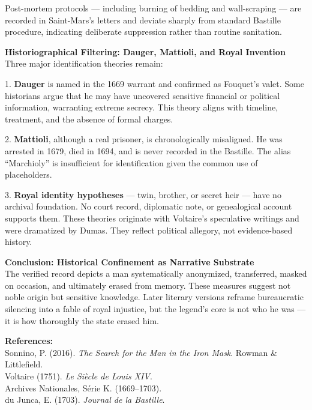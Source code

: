 \begin{technical}
Post-mortem protocols — including burning of bedding and wall-scraping — are recorded in Saint-Mars’s letters and deviate sharply from standard Bastille procedure, indicating deliberate suppression rather than routine sanitation.

\textbf{Historiographical Filtering: Dauger, Mattioli, and Royal Invention}\\[0.5em]
Three major identification theories remain:

1. \textbf{Dauger} is named in the 1669 warrant and confirmed as Fouquet’s valet. Some historians argue that he may have uncovered sensitive financial or political information, warranting extreme secrecy. This theory aligns with timeline, treatment, and the absence of formal charges.

2. \textbf{Mattioli}, although a real prisoner, is chronologically misaligned. He was arrested in 1679, died in 1694, and is never recorded in the Bastille. The alias “Marchioly” is insufficient for identification given the common use of placeholders.

3. \textbf{Royal identity hypotheses} — twin, brother, or secret heir — have no archival foundation. No court record, diplomatic note, or genealogical account supports them. These theories originate with Voltaire’s speculative writings and were dramatized by Dumas. They reflect political allegory, not evidence-based history.

\textbf{Conclusion: Historical Confinement as Narrative Substrate}\\[0.5em]
The verified record depicts a man systematically anonymized, transferred, masked on occasion, and ultimately erased from memory. These measures suggest not noble origin but sensitive knowledge. Later literary versions reframe bureaucratic silencing into a fable of royal injustice, but the legend’s core is not who he was — it is how thoroughly the state erased him.

\vspace{0.5em}
\textbf{References:}\\
Sonnino, P. (2016). \textit{The Search for the Man in the Iron Mask}. Rowman \& Littlefield.\\
Voltaire (1751). \textit{Le Siècle de Louis XIV}.\\
Archives Nationales, Série K. (1669–1703).\\
du Junca, E. (1703). \textit{Journal de la Bastille}.
\end{technical}
